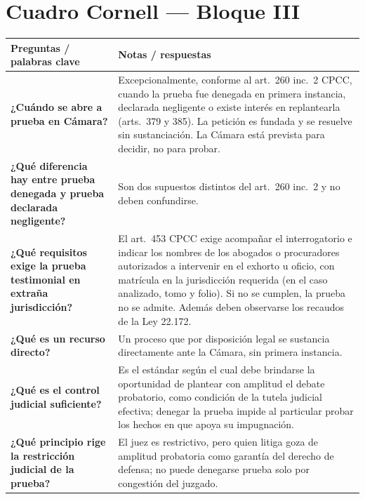 \documentclass[12pt,oneside]{book}
\begin{document}
\section{Cuadro Cornell --- Bloque III}

\begin{longtable}{@{}>{\raggedright\arraybackslash}p{}>{\raggedright\arraybackslash}p{}@{}}
\toprule
\textbf{Preguntas / palabras clave} & \textbf{Notas / respuestas} \\
\midrule
\endhead

\textbf{¿Cuándo se abre a prueba en Cámara?} &
Excepcionalmente, conforme al art.\ 260 inc.\ 2 CPCC, cuando la prueba fue denegada en primera instancia, declarada negligente o existe interés en replantearla (arts.\ 379 y 385). La petición es fundada y se resuelve sin sustanciación. La Cámara está prevista para decidir, no para probar. \\[0.6em]

\textbf{¿Qué diferencia hay entre prueba denegada y prueba declarada negligente?} &
Son dos supuestos distintos del art.\ 260 inc.\ 2 y no deben confundirse. \\[0.6em]

\textbf{¿Qué requisitos exige la prueba testimonial en extraña jurisdicción?} &
El art.\ 453 CPCC exige acompañar el interrogatorio e indicar los nombres de los abogados o procuradores autorizados a intervenir en el exhorto u oficio, con matrícula en la jurisdicción requerida (en el caso analizado, tomo y folio). Si no se cumplen, la prueba no se admite. Además deben observarse los recaudos de la Ley 22.172. \\[0.6em]

\textbf{¿Qué es un recurso directo?} &
Un proceso que por disposición legal se sustancia directamente ante la Cámara, sin primera instancia. \\[0.6em]

\textbf{¿Qué es el control judicial suficiente?} &
Es el estándar según el cual debe brindarse la oportunidad de plantear con amplitud el debate probatorio, como condición de la tutela judicial efectiva; denegar la prueba impide al particular probar los hechos en que apoya su impugnación. \\[0.6em]

\textbf{¿Qué principio rige la restricción judicial de la prueba?} &
El juez es restrictivo, pero quien litiga goza de amplitud probatoria como garantía del derecho de defensa; no puede denegarse prueba solo por congestión del juzgado. \\[0.6em]


\end{longtable}
\end{document}
